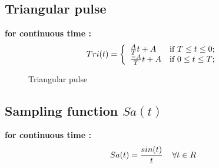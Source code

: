 \documentclass[a4paper,12pt]{book}
\begin{document}
\subsection*{Triangular pulse}
{\bf for continuous time :}\\
	\[ Tri(t) = \left\{ \begin{array}{ll}

	\frac{A}{T}t+A & \mbox{if $ T \leq t \leq 0$;} \\

	\frac{-A}{T}t+A & \mbox{if $0 \leq t \leq T$;} \\

	\end{array}
	\right. \]
\begin{figure}[h]  
\centering 
{}
\caption{Triangular pulse} \label{fig:M}  
\end{figure}

\subsection*{Sampling function $Sa(t)$}
{\bf for continuous time :}\\
	$$Sa(t) =\frac{sin(t)}{t} \hspace{4mm}\forall t \in R $$
\bigskip\\
\end{document}
